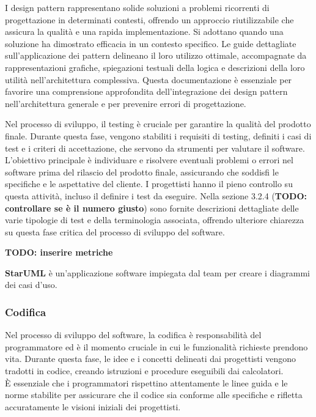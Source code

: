 I design pattern rappresentano solide soluzioni a problemi ricorrenti di progettazione in determinati contesti, offrendo un approccio riutilizzabile che assicura la qualità e una rapida implementazione. Si adottano quando una soluzione ha dimostrato efficacia in un contesto specifico. Le guide dettagliate sull'applicazione dei pattern delineano il loro utilizzo ottimale, accompagnate da rappresentazioni grafiche, spiegazioni testuali della logica e descrizioni della loro utilità nell'architettura complessiva. Questa documentazione è essenziale per favorire una comprensione approfondita dell'integrazione dei design pattern nell'architettura generale e per prevenire errori di progettazione.

Nel processo di sviluppo, il testing è cruciale per garantire la qualità del prodotto finale. Durante questa fase, vengono stabiliti i requisiti di testing, definiti i casi di test e i criteri di accettazione, che servono da strumenti per valutare il software.\\ L'obiettivo principale è individuare e risolvere eventuali problemi o errori nel software prima del rilascio del prodotto finale, assicurando che soddisfi le specifiche e le aspettative del cliente. I progettisti hanno il pieno controllo su questa attività, incluso il definire i test da eseguire. Nella sezione 3.2.4 (\textbf{TODO: controllare se è il numero giusto}) sono fornite descrizioni dettagliate delle varie tipologie di test e della terminologia associata, offrendo ulteriore chiarezza su questa fase critica del processo di sviluppo del software.

\textbf{TODO: inserire metriche}

\textbf{StarUML} è un'applicazione software impiegata dal team per creare i diagrammi dei casi d'uso.

\subsubsection{Codifica}
Nel processo di sviluppo del software, la codifica è responsabilità del programmatore ed è il momento cruciale in cui le funzionalità richieste prendono vita. Durante questa fase, le idee e i concetti delineati dai progettisti vengono tradotti in codice, creando istruzioni e procedure eseguibili dai calcolatori.\\ È essenziale che i programmatori rispettino attentamente le linee guida e le norme stabilite per assicurare che il codice sia conforme alle specifiche e rifletta accuratamente le visioni iniziali dei progettisti.

